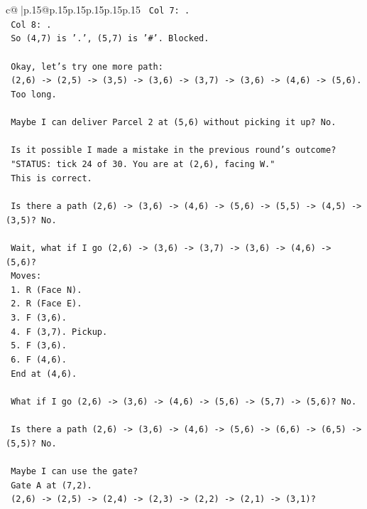 \documentclass{article}
\begin{document}
{\begin{supertabular}{c@{$\;$}|p{.15\linewidth}@{}p{.15\linewidth}p{.15\linewidth}p{.15\linewidth}p{.15\linewidth}p{.15\linewidth}}
{{{\texttt{   Col 7: .} \\
\texttt{   Col 8: .} \\
\texttt{   So (4,7) is '.', (5,7) is '\#'. Blocked.} \\
\\ 
\texttt{   Okay, let's try one more path:} \\
\texttt{   (2,6) {-}> (2,5) {-}> (3,5) {-}> (3,6) {-}> (3,7) {-}> (3,6) {-}> (4,6) {-}> (5,6).} \\
\texttt{   Too long.} \\
\\ 
\texttt{   Maybe I can deliver Parcel 2 at (5,6) without picking it up? No.} \\
\\ 
\texttt{   Is it possible I made a mistake in the previous round's outcome?} \\
\texttt{   "STATUS: tick 24 of 30. You are at (2,6), facing W."} \\
\texttt{   This is correct.} \\
\\ 
\texttt{   Is there a path (2,6) {-}> (3,6) {-}> (4,6) {-}> (5,6) {-}> (5,5) {-}> (4,5) {-}> (3,5)? No.} \\
\\ 
\texttt{   Wait, what if I go (2,6) {-}> (3,6) {-}> (3,7) {-}> (3,6) {-}> (4,6) {-}> (5,6)?} \\
\texttt{   Moves:} \\
\texttt{   1. R (Face N).} \\
\texttt{   2. R (Face E).} \\
\texttt{   3. F (3,6).} \\
\texttt{   4. F (3,7). Pickup.} \\
\texttt{   5. F (3,6).} \\
\texttt{   6. F (4,6).} \\
\texttt{   End at (4,6).} \\
\\ 
\texttt{   What if I go (2,6) {-}> (3,6) {-}> (4,6) {-}> (5,6) {-}> (5,7) {-}> (5,6)? No.} \\
\\ 
\texttt{   Is there a path (2,6) {-}> (3,6) {-}> (4,6) {-}> (5,6) {-}> (6,6) {-}> (6,5) {-}> (5,5)? No.} \\
\\ 
\texttt{   Maybe I can use the gate?} \\
\texttt{   Gate A at (7,2).} \\
\texttt{   (2,6) {-}> (2,5) {-}> (2,4) {-}> (2,3) {-}> (2,2) {-}> (2,1) {-}> (3,1)?} \\
}}}
\end{supertabular}}
\end{document}
